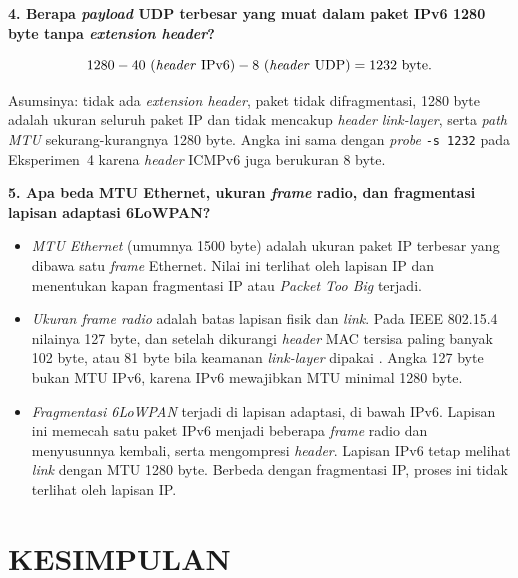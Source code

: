 \documentclass[12pt,a4paper]{report}
\newcommand{\kode}[1]{\texttt{\small #1}}
\begin{document}
\textbf{4. Berapa \emph{payload} UDP terbesar yang muat dalam paket IPv6 1280 byte tanpa \emph{extension header}?}

\[
1280 - 40\ (\text{\emph{header} IPv6}) - 8\ (\text{\emph{header} UDP}) = 1232\ \text{byte}.
\]

Asumsinya: tidak ada \emph{extension header}, paket tidak difragmentasi, 1280 byte adalah ukuran seluruh paket IP dan tidak mencakup \emph{header} \emph{link-layer}, serta \emph{path MTU} sekurang-kurangnya 1280 byte. Angka ini sama dengan \emph{probe} \kode{-s 1232} pada Eksperimen~4 karena \emph{header} ICMPv6 juga berukuran 8 byte.

\textbf{5. Apa beda MTU Ethernet, ukuran \emph{frame} radio, dan fragmentasi lapisan adaptasi 6LoWPAN?}

\begin{itemize}
    \item \emph{MTU Ethernet} (umumnya 1500 byte) adalah ukuran paket IP terbesar yang dibawa satu \emph{frame} Ethernet. Nilai ini terlihat oleh lapisan IP dan menentukan kapan fragmentasi IP atau \emph{Packet Too Big} terjadi.
    \item \emph{Ukuran frame radio} adalah batas lapisan fisik dan \emph{link}. Pada IEEE 802.15.4 nilainya 127 byte, dan setelah dikurangi \emph{header} MAC tersisa paling banyak 102 byte, atau 81 byte bila keamanan \emph{link-layer} dipakai \cite{rfc4944}. Angka 127 byte bukan MTU IPv6, karena IPv6 mewajibkan MTU minimal 1280 byte.
    \item \emph{Fragmentasi 6LoWPAN} terjadi di lapisan adaptasi, di bawah IPv6. Lapisan ini memecah satu paket IPv6 menjadi beberapa \emph{frame} radio dan menyusunnya kembali, serta mengompresi \emph{header}. Lapisan IPv6 tetap melihat \emph{link} dengan MTU 1280 byte. Berbeda dengan fragmentasi IP, proses ini tidak terlihat oleh lapisan IP.
\end{itemize}


\chapter{KESIMPULAN}
\end{document}
